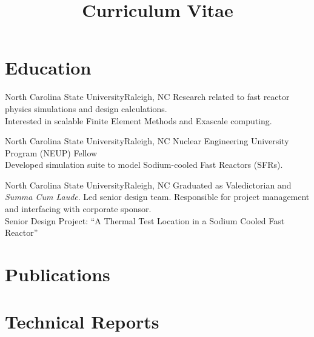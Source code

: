\documentclass[letterpaper,12pt,nocolor,final]{moderncv}
\title{Curriculum Vitae}
\begin{document}
\maketitle

\nocite{*}


\section{Education}  

    {North Carolina State University}{Raleigh, NC}{}{
    Research related to fast reactor physics simulations and design calculations.\\
    Interested in scalable Finite Element Methods and Exascale computing.}
  \vspace{\topsep}

    {North Carolina State University}{Raleigh, NC}{}{
    Nuclear Engineering University Program (NEUP) Fellow \\
    Developed simulation suite to model Sodium-cooled Fast Reactors (SFRs).
    \vspace{-1\topsep}
    \printbibliography[keyword={mastersthesis},heading=none]}
  \vspace{\topsep}

    {North Carolina State University}{Raleigh, NC}{}{
    Graduated as Valedictorian and \textit{Summa Cum Laude}.
    Led senior design team. Responsible for project management and interfacing with corporate sponsor. \\
    Senior Design Project: ``A Thermal Test Location in a Sodium Cooled Fast Reactor''}


\section{Publications}
  \printbibliography[keyword={publications},heading=none]

\section{Technical Reports}
  \printbibliography[keyword={techreport},heading=none]
\end{document}
